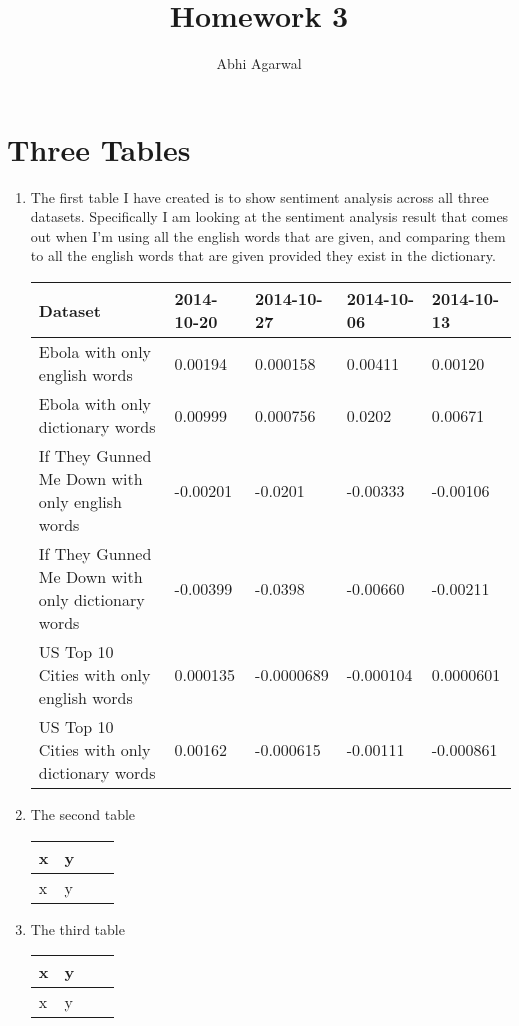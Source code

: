 \documentclass[11pt, oneside]{article}
\title{Homework 3}
\author{Abhi Agarwal}
\date{}
\begin{document}
\maketitle

\section*{Three Tables}
\begin{enumerate}
\item The first table I have created is to show sentiment analysis across all three datasets. Specifically I am looking at the sentiment analysis result that comes out when I'm using all the english words that are given, and comparing them to all the english words that are given provided they exist in the dictionary. 

\begin{tabularx}{\textwidth}{X|l|l|l|l}
\textbf{Dataset} & \textbf{2014-10-20} & \textbf{2014-10-27} & \textbf{2014-10-06} & \textbf{2014-10-13} \\
\hline Ebola with only english words & 0.00194 & 0.000158 & 0.00411 & 0.00120 \\ 
\hline Ebola with only dictionary words & 0.00999 & 0.000756 & 0.0202 & 0.00671 \\ 
\hline If They Gunned Me Down with only english words & -0.00201 & -0.0201 & -0.00333 & -0.00106 \\ 
\hline If They Gunned Me Down with only dictionary words & -0.00399 & -0.0398 & -0.00660 & -0.00211 \\ 
\hline US Top 10 Cities with only english words & 0.000135 & -0.0000689 & -0.000104 & 0.0000601 \\ 
\hline US Top 10 Cities with only dictionary words & 0.00162 & -0.000615 & -0.00111 & -0.000861 \\ 

\hline \end{tabularx}

\item The second table

\begin{center}
    \begin{tabular}{| l | l | l | l |}
    \hline
    x & y \\ \hline
    x & y \\ \hline
    \end{tabular}
\end{center}

\item The third table

\begin{center}
    \begin{tabular}{| l | l | l | l |}
    \hline
    x & y \\ \hline
    x & y \\ \hline
    \end{tabular}
\end{center}

\end{enumerate}
\end{document}
